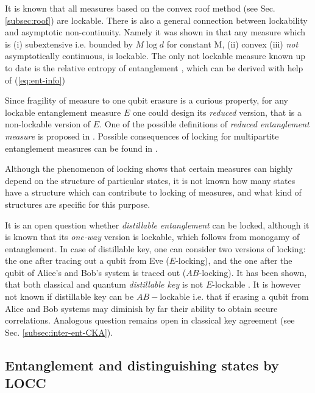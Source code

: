 \documentclass[twocolumn,aps,rmp]{revtex4}
\begin{document}
It is known that all measures based on the convex roof method (see Sec. \ref{subsec:roof}) are lockable. There is also a general connection between lockability and
asymptotic non-continuity. Namely it was shown in \cite{lock-ent} that
any measure which is (i) subextensive i.e. bounded by $M \log d$ for
constant M, (ii) convex (iii) {\it not} asymptotically continuous, is
lockable. The only not lockable measure known up to date is the
relative entropy of entanglement \cite{lock-ent},
which can be derived with help of (\ref{eq:ent-info})


Since fragility of measure to one qubit erasure is a curious property,
for any lockable entanglement measure $E$ one could design its {\it
reduced} version, that is a non-lockable version of $E$.
One of the possible definitions of {\it reduced entanglement measure} is proposed in \cite{lock-ent}. Possible consequences of locking for multipartite entanglement
measures can be found in \cite{GroismanLindenPopescu}.

Although the phenomenon of locking shows that certain measures can
highly depend on the structure of particular states, it is not known how many
states have a structure which can contribute to locking of measures,
and what kind of structures are specific for this purpose.


It is an open question whether {\it distillable entanglement} can be
locked, although it is known that its {\it one-way} version is
lockable, which follows from monogamy of entanglement. In case of
distillable key, one can consider two versions of locking: the one
after tracing out a qubit from Eve ($E$-locking), and the one after
the qubit of Alice's and Bob's system is traced out ($AB$-locking).
It has been shown, that both classical and quantum {\it distillable
  key} is not $E$-lockable
\cite{renner-wolf-gap,EkertCHHOR2006-ABEkey}. It is however not known
if distillable key can be $AB-$lockable i.e. that if erasing a qubit
from Alice and Bob systems may diminish by far their ability to obtain
secure correlations. Analogous question remains open in classical key
agreement (see Sec. \ref{subsec:inter-ent-CKA}).



\subsection{Entanglement and distinguishing states by LOCC}
\label{sec:rozroz}
\end{document}
